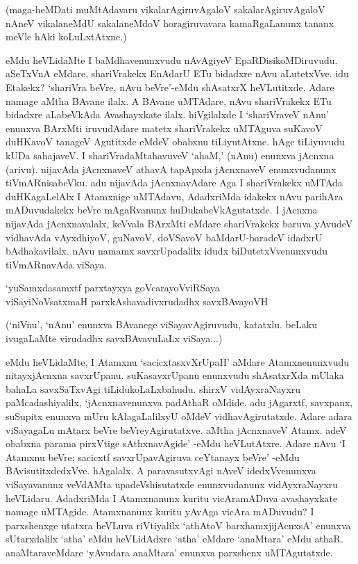 (maga-heMDati muMtAdavaru vikalarAgiruvAgaloV sakalarAgiruvAgaloV nAneV vikalaneMdU sakalaneMdoV horagiruvavara kamaRgaLanunx tananx meVle hAki koLuLxtAtxne.)

eMdu heVLidaMte I baMdhavenunxvudu nAvAgiyeV EpaRDisikoMDiruvudu. aSeTxVnA eMdare, shariVrakekx EnAdarU ETu bidadxre nAvu aLutetxVve. idu Etakekx? `shariVra beVre, nAvu beVre'-eMdu shAsatxrX heVLutitxde. Adare namage aMtha BAvane ilalx. A BAvane uMTAdare, nAvu shariVrakekx ETu bidadxre aLabeVkAda Avashayxkate ilalx. hiVgilalxde I `shariVraveV nAnu' enunxva BArxMti iruvudAdare matetx shariVrakekx uMTAguva suKavoV duHKavoV tanageV Agutitxde eMdeV obabxnu tiLiyutAtxne. hAge tiLiyuvudu kUDa sahajaveV. I shariVradaMtahavuveV `ahaM,' (nAnu) enunxva jAcnxna (arivu). nijavAda jAcnxnaveV athavA tapApxda jAcnxnaveV enunxvudanunx tiVmARnisabeVku. adu nijavAda jAcnxnavAdare Aga I shariVrakekx uMTAda duHKagaLelAlx I Atamxnige uMTAdavu, AdadxriMda idakekx nAvu parihAra mADuvudakekx beVre mAgaRvanunx huDukabeVkAgutatxde. I jAcnxna nijavAda jAcnxnavalalx, keVvala BArxMti eMdare shariVrakekx baruva yAvudeV vidhavAda vAyxdhiyoV, guNavoV, doVSavoV baMdarU-baradeV idadxrU bAdhakavilalx. nAvu namamx savxrUpadalilx idudx biDutetxVvenunxvudu tiVmARnavAda viSaya.

\begin{shloka}
`yuSamxdasamxtf parxtayxya goVcarayoVviRSaya\\
viSayiNoVsatxmaH parxkAshavadivxrudadhx savxBAvayoVH
\end{shloka}

(`niVnu', `nAnu' enunxva BAvanege viSayavAgiruvudu, katatxlu. beLaku ivugaLaMte virudadhx savxBAvavuLaLx viSaya$\ldots$)

eMdu heVLidaMte, I Atamxnu `sacicxtasxvXrUpaH' aMdare Atamxnenunxvudu nitayxjAcnxna savxrUpanu. suKasavxrUpanu enunxvudu shAsatxrXda mUlaka bahaLa savxSaTxvAgi tiLidukoLaLxbahudu. shirxV vidAyxraNayxru paMcadashiyalilx, `jAcnxnavenunxva padAthaR oMdide. adu jAgarxtf, savxpanx, suSupitx enunxva mUru kAlagaLalilxyU oMdeV vidhavAgirutatxde. Adare adara viSayagaLu mAtarx beVre beVreyAgirutatxve. aMtha jAcnxnaveV Atamx. adeV obabxna parama pirxVtige sAthxnavAgide' -eMdu heVLutAtxre. Adare nAvu `I Atamxnu beVre; sacicxtf savxrUpavAgiruva ceYtanayx beVre' -eMdu BAvisutitxdedxVve. hAgalalx. A paravasutxvAgi nAveV idedxVvenunxva viSayavanunx veVdAMta upadeVshisutatxde enunxvudanunx vidAyxraNayxru heVLidaru. AdadxriMda I Atamxnanunx kuritu vicAramADuva avashayxkate namage uMTAgide. Atamxnanunx kuritu yAvAga vicAra mADuvudu? I parxshenxge utatxra heVLuva riVtiyalilx `athAtoV barxhamxjijAcnxsA' enunxva sUtarxdalilx `atha' eMdu heVLidAdxre `atha' eMdare `anaMtara' eMdu athaR. anaMtaraveMdare `yAvudara anaMtara' enunxva parxshenx uMTAgutatxde.

